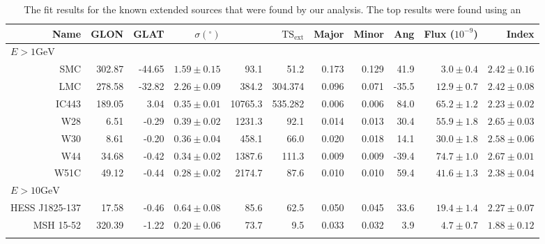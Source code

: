 \documentclass[preprint]{aastex}
\newcommand{\gev}{\text{GeV}\xspace}
\newcommand{\tsext}{\ensuremath{\text{TS}_\text{ext}}\xspace}
\newcommand{\ts}{\text{TS}\xspace}
\renewcommand{\deg}{\ensuremath{^\circ}\xspace}
\begin{document}
\clearpage
\begin{table}
    \begin{centering}
      \begin{tabular}{rrrrrrrrrrr}
        Name           &    GLON &    GLAT & $\sigma(\deg)$ &     \ts & $\tsext$ & Major & Minor &   Ang & Flux ($10^{-9}$) &         Index \\
        \hline
        \multicolumn{11}{l}{$E > 1\gev$} \\
        \hline
        SMC            & 302.87  &  -44.65 &    $1.59\pm0.15$ &    93.1 &                   51.2 & 0.173 & 0.129 &  41.9 &   $3.0\pm0.4$    & $2.42\pm0.16$ \\
        LMC            & 278.58  &  -32.82 &    $2.26\pm0.09$ &   384.2 &                304.374 & 0.096 & 0.071 & -35.5 &  $12.9\pm0.7$    & $2.42\pm0.08$ \\
        IC443          & 189.05  &  3.04   &    $0.35\pm0.01$ & 10765.3 &                535.282 & 0.006 & 0.006 &  84.0 &  $65.2\pm1.2$    & $2.23\pm0.02$ \\
        W28            & 6.51    &  -0.29  &    $0.39\pm0.02$ &  1231.3 &                   92.1 & 0.014 & 0.013 &  30.4 &  $55.9\pm1.8$    & $2.65\pm0.03$ \\
        W30            & 8.61    &  -0.20  &    $0.36\pm0.04$ &   458.1 &                  66.0  & 0.020 & 0.018 &  14.1 &  $30.0\pm1.8$    & $2.58\pm0.06$ \\
        W44            & 34.68   &  -0.42  &    $0.34\pm0.02$ &  1387.6 &                  111.3 & 0.009 & 0.009 & -39.4 &  $74.7\pm1.0$    & $2.67\pm0.01$ \\
        W51C           & 49.12   &  -0.44  &    $0.28\pm0.02$ &  2174.7 &                   87.6 & 0.010 & 0.010 &  59.4 &  $41.6\pm1.3$    & $2.38\pm0.04$ \\
        \hline
        \multicolumn{11}{l}{$E > 10\gev$} \\
        \hline
        HESS J1825-137 &   17.58 &   -0.46 &    $0.64\pm0.08$ &    85.6 &                   62.5 & 0.050 & 0.045 & 33.6  &     $19.4\pm1.4$ & $2.27\pm0.07$ \\
        MSH 15-52      &  320.39 &   -1.22 &    $0.20\pm0.06$ &    73.7 &                    9.5 & 0.033 & 0.032 & 3.9   &      $4.7\pm0.7$ & $1.88\pm0.12$ \\
      \label{known_extended_sources}
      \end{tabular}
      \caption{The fit results for the known extended sources that
      were found by our analysis. The top results were found using an
}
\end{centering}
\end{table}
\end{document}
